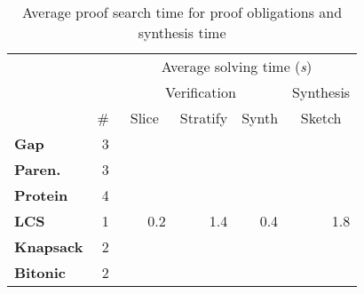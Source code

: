 \begin{table}
\centering
\renewcommand\a{({\it i})}    %
\renewcommand\b{({\it ii})}
\renewcommand\c{({\it iii})}
\begin{tabular}{|l|r|rrr|r|}
  \cline{2-6}
  \multicolumn{1}{c|}{} &    & \multicolumn{4}{c|}{\small Average solving time ({\it s})}  \\
  \multicolumn{1}{c|}{} &    & \multicolumn{3}{c|}{\small Verification} & {\small Synthesis} \\
  \multicolumn{1}{c|}{} & \# & \multicolumn{1}{c|}{~\sf Slice~} & \multicolumn{1}{c|}{\sf Stratify} & \multicolumn{1}{c|}{\sf Synth} & \multicolumn{1}{c|}{Sketch} \\
  \hline
  {\bf Gap} & 3 &  & \\
  \hline
  {\bf Paren.} & 3 & & \\
  \hline
  {\bf Protein} & 4 & & \\
  \hline
  {\bf LCS} & 1 &  0.2  &  1.4  &  0.4  &  1.8 \\
  \hline
  {\bf Knapsack} & 2 & & \\
  \hline
  {\bf Bitonic} & 2 & & \\
  \hline
\end{tabular}
\caption{\label{evaluation:solving time}
  Average proof search time for proof obligations and synthesis
  time}
\end{table}



